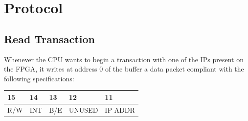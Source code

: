%
\chapter{Protocol}
\label{chap1}



\section{Read Transaction}

Whenever the CPU wants to begin a transaction with one of the IPs present on the FPGA, it writes at address 0 of the buffer a data packet compliant with the following specifications: 
\bigskip
\begin{center}
	\begin{tabular}{ | l | l |  l | l | l |}
		
		15 & 14 & 13 & 12 & 11 \qquad \qquad 0 \\ \hline
		R/W & INT & B/E & UNUSED & IP ADDR\\ \hline
		
		
		\hline
	\end{tabular}
\end{center}

